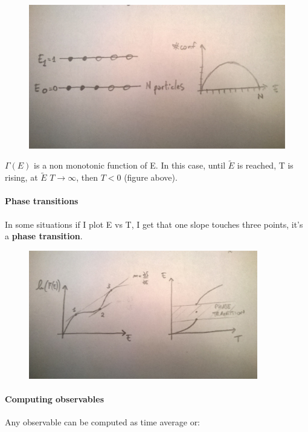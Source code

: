 \documentclass[a4paper, italian, openany]{book}
\begin{document}
\begin{figure}[H]
\centering
\includegraphics[width=140mm]{img/figure7.jpg}
\end{figure}

$\Gamma (E)$ is a non monotonic function of E. In this case, until $\tilde{E}$ is reached, T is rising, at $\tilde{E}$ $T \to \infty$, then $T<0$ (figure above).

\paragraph{Phase transitions}

In some situations if I plot E vs T, I get that one slope touches three points, it's a \textbf{phase transition}.

\begin{figure}[H]
\centering
\includegraphics[width=100mm]{img/figure8.jpg}
\end{figure}

\paragraph{Computing observables}

Any observable can be computed as time average or:
\end{document}
